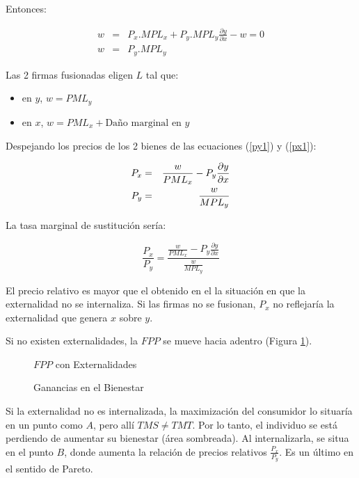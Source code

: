 Entonces:

\begin{eqnarray}
 w &=& P_x .MPL_x + P_y.MPL_y \frac{\partial y}{\partial x}-w=0 \label{px1}\\
 w &=& P_y.MPL_y \label{py1}
\end{eqnarray}

Las 2 firmas fusionadas eligen $L$ tal que:
\begin{itemize}
 \item en $y$, $w=PML_y$
 \item en $x$, $w=PML_x+\mbox{Daño marginal en }y$
\end{itemize}

Despejando los precios de los 2 bienes de las ecuaciones (\ref{py1}) y (\ref{px1}):

\begin{eqnarray}
 P_x &=& \frac{w}{PML_x}-P_y \frac{\partial y}{\partial x} \nonumber\\
 P_y &=& \frac{w}{MPL_y} \label{optimo}
\end{eqnarray}

La tasa marginal de sustitución sería:

$$\frac{P_x}{P_y}=\frac{\frac{w}{PML_x}-P_y \frac{\partial
y}{\partial x}}{\frac{w}{MPL_y}}$$

El precio relativo es mayor que el obtenido en el la situación en que la externalidad no se internaliza.
Si las firmas no se fusionan, $P_x$ no reflejaría la externalidad que genera $x$ sobre $y$.

Si no existen externalidades, la $FPP$ se mueve hacia adentro (Figura \ref{fig:grafico1}).


\begin{figure}
	\centering
	\caption{$FPP$ con Externalidades}
	\label{fig:grafico1}
\end{figure}

\begin{figure}
	\centering
	\caption{Ganancias en el Bienestar}
	\label{fig:grafico2}
\end{figure}

Si la externalidad no es internalizada, la maximización del consumidor lo situaría en un punto como $A$, pero allí $TMS \neq TMT$. Por lo tanto, el individuo se está perdiendo de aumentar su bienestar (área sombreada). Al internalizarla, se situa en el punto $B$, donde aumenta la relación de precios relativos $\frac{P_x}{P_y}$. Es un último en el sentido de Pareto.

